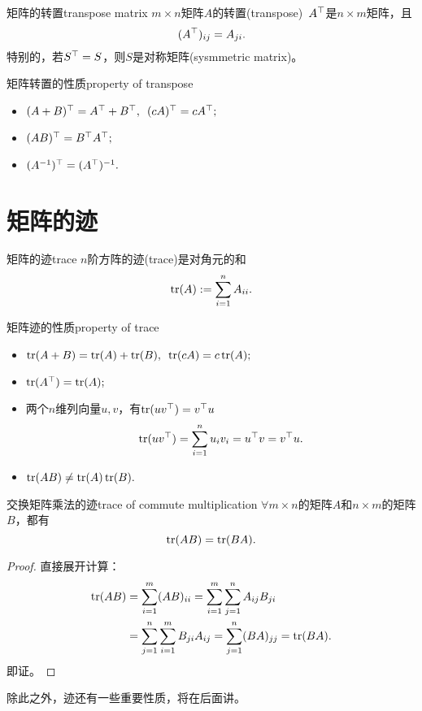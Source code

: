 \begin{definition}{矩阵的转置}{transpose matrix}
	$m\times n$矩阵$A$的转置(transpose)~$A^\top$是$n\times m$矩阵，且 
	\[
		(A^\top)_{ij}=A_{ji}.
	\]
	特别的，若$S^\top=S$，则$S$是对称矩阵(sysmmetric matrix)。
\end{definition}
\begin{theorem}{矩阵转置的性质}{property of transpose}
    \begin{itemize}
    	\item $(A+B)^\top=A^\top+B^\top,\enspace (cA)^\top=cA^\top;$
    	\item $(AB)^\top=B^\top A^\top;$
    	\item $(A^{-1})^\top=(A^\top)^{-1}.$
    \end{itemize}
\end{theorem}
\section{矩阵的迹}
\begin{definition}{矩阵的迹}{trace}
	$n$阶方阵的迹(trace)是对角元的和
	\begin{equation}
		\operatorname{tr}(A):=\sum_{i=1}^nA_{ii}.
	\end{equation}
\end{definition}
\begin{theorem}{矩阵迹的性质}{property of trace}
    \begin{itemize}
    	\item $\operatorname{tr}(A+B)=\operatorname{tr}(A)+\operatorname{tr}(B),\enspace \operatorname{tr}(cA)=c\operatorname{tr}(A);$
    	\item $\operatorname{tr}(A^\top)=\operatorname{tr}(A);$
    	\item 两个$n$维列向量$u,v$，有$\operatorname{tr}(uv^\top)=v^\top u$
    	\[
    		\operatorname{tr}(uv^\top)=\sum_{i=1}^nu_iv_i=u^\top v=v^\top u.
    	\]
    	\item $\operatorname{tr}(AB)\neq\operatorname{tr}(A)\operatorname{tr}(B).$
    \end{itemize}
\end{theorem}
\begin{theorem}{交换矩阵乘法的迹}{trace of commute multiplication}
	$\forall m\times n$的矩阵$A$和$n\times m$的矩阵$B$，都有
	\begin{equation}
		\operatorname{tr}(AB)=\operatorname{tr}(BA).
	\end{equation}
\end{theorem}
\begin{proof}
	直接展开计算：
	\begin{align*}
		\operatorname{tr}(AB)&=\sum_{i=1}^m(AB)_{ii}=\sum_{i=1}^m\sum_{j=1}^nA_{ij}B_{ji}\\
		&=\sum_{j=1}^n\sum_{i=1}^mB_{ji}A_{ij}=\sum_{j=1}^n(BA)_{jj}=\operatorname{tr}(BA).
	\end{align*}
	即证。
\end{proof}
除此之外，迹还有一些重要性质，将在后面讲。